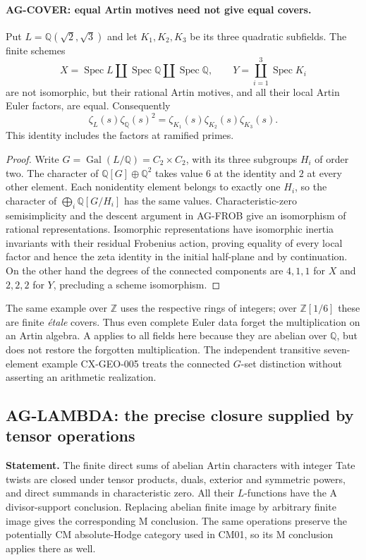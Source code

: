 \documentclass[11pt,a4paper]{article}
\begin{document}
\paragraph{AG-COVER: equal Artin motives need not give equal covers.}
Put $L=\mathbb Q(\sqrt2,\sqrt3)$ and let $K_1,K_2,K_3$ be its three
quadratic subfields. The finite schemes
\[
 X=\operatorname{Spec}L\amalg\operatorname{Spec}\mathbb Q
       \amalg\operatorname{Spec}\mathbb Q,
 \qquad
 Y=\coprod_{i=1}^3\operatorname{Spec}K_i
\]
are not isomorphic, but their rational Artin motives, and all their local
Artin Euler factors, are equal. Consequently
\[
 \zeta_L(s)\zeta_{\mathbb Q}(s)^2
       =\zeta_{K_1}(s)\zeta_{K_2}(s)\zeta_{K_3}(s).
\]
This identity includes the factors at ramified primes.

\begin{proof}
Write $G=\operatorname{Gal}(L/\mathbb Q)=C_2\times C_2$, with its three
subgroups $H_i$ of order two. The character of
$\mathbb Q[G]\oplus\mathbb Q^2$ takes value $6$ at the identity and
$2$ at every other element. Each nonidentity element belongs to exactly
one $H_i$, so the character of $\bigoplus_i\mathbb Q[G/H_i]$ has the
same values. Characteristic-zero semisimplicity and the descent argument
in AG-FROB give an isomorphism of rational representations. Isomorphic
representations have isomorphic inertia invariants with their residual
Frobenius action, proving equality of every local factor and hence the
zeta identity in the initial half-plane and by continuation. On the other
hand the degrees of the connected components are $4,1,1$ for $X$ and
$2,2,2$ for $Y$, precluding a scheme isomorphism.
\end{proof}

The same example over $\mathbb Z$ uses the respective rings of integers;
over $\mathbb Z[1/6]$ these are finite \emph{\'etale} covers. Thus even
complete Euler data forget the multiplication on an Artin algebra. A
applies to all fields here because they are abelian over $\mathbb Q$,
but does not restore the forgotten multiplication. The independent
transitive seven-element example CX-GEO-005 treats the connected
$G$-set distinction without asserting an arithmetic realization.

\subsection{AG-LAMBDA: the precise closure supplied by tensor operations}
\label{ag:lambda}

\textbf{Statement.} The finite direct sums of abelian Artin characters with
integer Tate twists are closed under tensor products, duals, exterior and
symmetric powers, and direct summands in characteristic zero. All their
$L$-functions have the A divisor-support conclusion. Replacing abelian
finite image by arbitrary finite image gives the corresponding M conclusion.
The same operations preserve the potentially CM absolute-Hodge category
used in CM01, so its M conclusion applies there as well.
\end{document}
